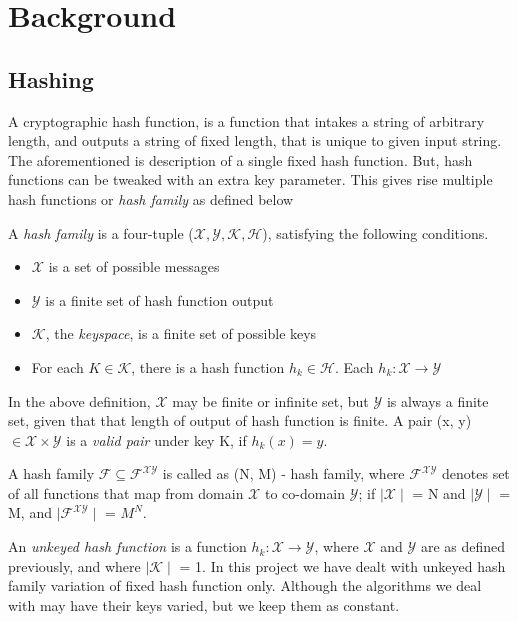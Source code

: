 \chapter{Background}

\section{Hashing}
A cryptographic hash function, is a function that intakes a string of arbitrary length, and outputs a 
string of fixed length, that is unique to given input string. The 
aforementioned is description of a single fixed hash function. But, hash functions can be tweaked
with an extra key parameter. This gives rise multiple hash functions or \emph{hash family} as 
defined below \cite{00005}

\begin{center}
  \framebox
  {
    \parbox{420pt}
    {
      A \emph{hash family} is a four-tuple ($\mathcal{X}, \mathcal{Y}, \mathcal{K}, \mathcal{H}$),
      satisfying the following conditions.
      \begin{itemize}
        \item $\mathcal{X}$ is a set of possible messages
        \item $\mathcal{Y}$ is a finite set of hash function output
        \item $\mathcal{K}$, the \emph{keyspace}, is a finite set of possible keys
        \item For each $K \in \mathcal{K}$, there is a hash function $h_{k} \in \mathcal{H}$. Each 
          $h_{k}: \mathcal{X} \to \mathcal{Y}$ 
      \end{itemize}
    }
  }
\end{center}
\vspace{4mm}

In the above definition, $\mathcal{X}$ may be finite or infinite set, but $\mathcal{Y}$ is always
a finite set, given that that length of output of hash function is finite. A pair (x, y) $\in 
\mathcal{X} \times \mathcal{Y}$ is a \emph{valid pair} under key K, if 
$h_{k}(x) = y$.

A hash family $\mathcal{F} \subseteq \mathcal{F}^{\mathcal{XY}}$ is called as (N, M) - hash family, where
$\mathcal{F}^{\mathcal{X}\mathcal{Y}}$ denotes set of all functions that map from domain $\mathcal{X}$
to co-domain $\mathcal{Y}$; if $\mid\mathcal{X}\mid$ = N and $\mid\mathcal{Y}\mid$ = M, and 
$\mid\mathcal{F}^{\mathcal{XY}}\mid$ = $M^{N}$.

An \emph{unkeyed hash function} is a function $h_{k}: \mathcal{X} \to \mathcal{Y}$, where $\mathcal{X}$ and
$\mathcal{Y}$ are as defined previously, and where $\mid\mathcal{K}\mid$ = 1. 
In this project we have dealt with unkeyed hash family variation of fixed hash function only. Although the
algorithms we deal with may have their keys varied, but we keep them as constant.

